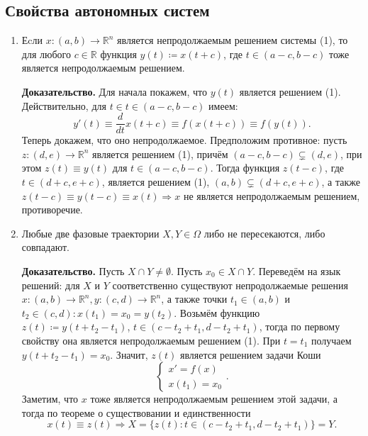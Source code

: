 \subsection{Свойства автономных систем}
\begin{enumerate}
    \item Еcли $x\colon (a, b) \to \mathbb R^n$ является непродолжаемым решением системы (1), то для любого $c \in \mathbb R$ функция $y(t) \coloneq x(t + c)$, где $t \in (a-c, b-c)$ тоже является непродолжаемым решением.
    
    \textbf{Доказательство.} Для начала покажем, что $y(t)$ является решением (1). Действительно, для $t \in t \in (a-c, b-c)$ имеем:
    $$y'(t) \equiv \frac{d}{dt}x(t+c) \equiv f(x(t+c)) \equiv f(y(t)).$$
    Теперь докажем, что оно непродолжаемое. Предположим противное: пусть $z\colon (d, e) \to \mathbb{R}^n$ является решением (1), причём $(a-c, b-c) \subsetneq (d, e)$, при этом $z(t) \equiv y(t)$ для $t \in (a-c, b-c)$. Тогда функция $z(t-c)$, где $t \in (d + c, e+c)$,
    является решением (1), $(a, b) \subsetneq (d+c, e+c)$, а также $z(t-c) \equiv y(t-c) \equiv x(t) \Rightarrow x$ не является непродолжаемым решением, противоречие.

    \QED

    \item Любые две фазовые траектории $X, Y \in \Omega$ либо не пересекаются, либо совпадают.

        \textbf{Доказательство.} Пусть $X \cap Y \neq \emptyset$. Пусть $x_0 \in X \cap Y$. Переведём на язык решений: для $X$ и $Y$ соответственно существуют непродолжаемые решения $x\colon (a, b) \to \mathbb{R}^n, y\colon (c, d) \to \mathbb{R}^n$, а также точки $t_1 \in (a, b)$ и $t_2 \in (c, d): x(t_1)=x_0=y(t_2)$.
        Возьмём функцию $z(t) \coloneq y(t + t_2 - t_1)$, $t \in (c - t_2 + t_1, d - t_2 + t_1)$, тогда по первому свойству она является непродолжаемым решением (1). При $t=t_1$ получаем $y(t + t_2 - t_1) = x_0$. Значит, $z(t)$ является решением задачи Коши
        \begin{equation}
            \begin{cases}
                x' = f(x) \\
                x(t_1) = x_0
            \end{cases}.
            \nonumber
        \end{equation}
        Заметим, что $x$ тоже является непродолжаемым решением этой задачи, а тогда по теореме о существовании и единственности $$x(t) \equiv z(t) \Rightarrow X = \{z(t) : t \in (c-t_2+t_1, d-t_2+t_1)\} = Y.$$


\end{enumerate}
